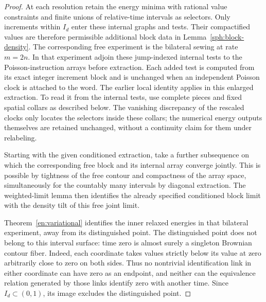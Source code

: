 \begin{proof}
At each resolution retain the energy minima with rational value
constraints and finite unions of relative-time intervals as selectors.
Only increments within $I_d$ enter these internal graphs and tests.
Their compactified values are therefore permissible additional block
data in Lemma~\ref{sph:block-density}.  The corresponding free
experiment is the bilateral sewing at rate $m=2n$.  In that experiment
adjoin these jump-indexed internal tests to the Poisson-instruction
arrays before extraction.  Each added test is computed from its exact
integer increment block and is unchanged when an independent Poisson
clock is attached to the word.  The earlier local identity applies
in this enlarged extraction.  To read it from the internal tests,
use complete pieces and fixed spatial collars as described below.
The vanishing discrepancy of the rescaled clocks only
locates the selectors inside these collars; the numerical energy
outputs themselves are retained unchanged, without a continuity
claim for them under relabeling.

Starting with the given conditioned extraction, take a further
subsequence on which the corresponding free block and its internal
array converge jointly.  This is possible by tightness of the free
contour and compactness of the array space, simultaneously for the
countably many intervals by diagonal extraction.  The weighted-limit
lemma then identifies the already specified conditioned block limit
with the density tilt of this free joint limit.

Theorem~\ref{en:variational} identifies the inner relaxed energies in
that bilateral experiment, away from its distinguished point.  The
distinguished point does not belong to this interval surface:
time zero is almost surely a singleton Brownian contour fiber.
Indeed, each coordinate takes values strictly below its value at zero
arbitrarily close to zero on both sides.  Thus no nontrivial
identification link in either coordinate can have zero as an
endpoint, and neither can the equivalence relation generated by
those links identify zero with another time.  Since $I_d\subset(0,1)$,
its image excludes the distinguished point.


\end{proof}
